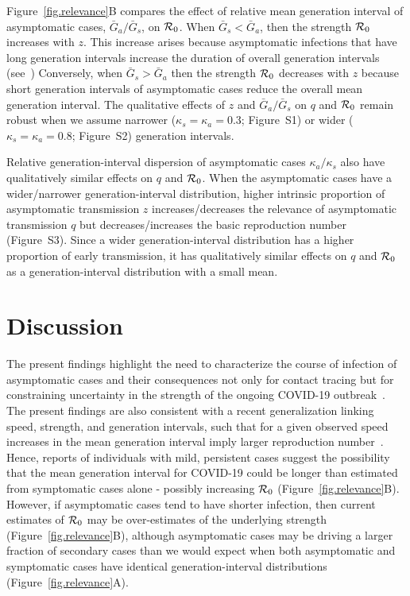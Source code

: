 Figure~\ref{fig.relevance}B compares the effect of relative mean generation interval of asymptomatic cases, $\bar G_a/\bar G_s$, on ${\cal{R}}_0$.
When $\bar G_s < \bar G_a$, then the strength ${\cal{R}}_0$ increases with $z$.
This increase arises because asymptomatic infections that have long generation intervals increase the duration of overall generation intervals (see~\citep{park_2019practical})
Conversely, when $\bar G_s > \bar G_a$ then the strength ${\cal{R}}_0$ decreases with $z$ because short generation intervals of asymptomatic cases reduce the overall mean generation interval.
The qualitative effects of $z$ and $\bar G_a/\bar G_s$ on $q$ and ${\cal{R}}_0$ remain robust when we assume narrower ($\kappa_s = \kappa_a = 0.3$; Figure~S1) or wider ($\kappa_s = \kappa_a = 0.8$; Figure~S2) generation intervals.

Relative generation-interval dispersion of asymptomatic cases $\kappa_a/\kappa_s$ also have qualitatively similar effects on $q$ and ${\cal{R}}_0$.
When the asymptomatic cases have a wider/narrower generation-interval distribution, higher intrinsic proportion of asymptomatic transmission $z$ increases/decreases the relevance of asymptomatic transmission $q$ but decreases/increases the basic reproduction number (Figure~S3).
Since a wider generation-interval distribution has a higher proportion of early transmission, it has qualitatively similar effects on $q$ and ${\cal{R}}_0$ as a generation-interval distribution with a small mean.

\section{Discussion}

The present findings highlight the need to characterize the course of infection of asymptomatic cases and their consequences not only for contact tracing but for constraining uncertainty in the strength of the ongoing COVID-19 outbreak~\citep{park_preprint}.
The present findings are also consistent with a recent generalization linking speed, strength, and generation intervals, such that for a given observed speed increases in the mean generation interval imply larger reproduction number~\citep{park_2019practical}. 
Hence, reports of individuals with mild, persistent cases suggest the possibility that the mean generation interval for COVID-19 could be longer than estimated from symptomatic cases alone - possibly increasing ${\cal{R}}_0$ (Figure~\ref{fig.relevance}B).
However, if asymptomatic cases tend to have shorter infection, then current estimates of ${\cal{R}}_0$ may be over-estimates of the underlying strength (Figure~\ref{fig.relevance}B), although asymptomatic cases may be driving a larger fraction of secondary cases than we would expect when both asymptomatic and symptomatic cases have identical generation-interval distributions (Figure~\ref{fig.relevance}A).


